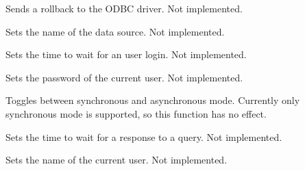 
Sends a rollback to the ODBC driver. Not implemented.



Sets the name of the data source. Not implemented.



Sets the time to wait for an user login. Not implemented.



Sets the password of the current user. Not implemented.



Toggles between synchronous and asynchronous mode. Currently only synchronous
mode is supported, so this function has no effect.



Sets the time to wait for a response to a query. Not implemented.



Sets the name of the current user. Not implemented.


